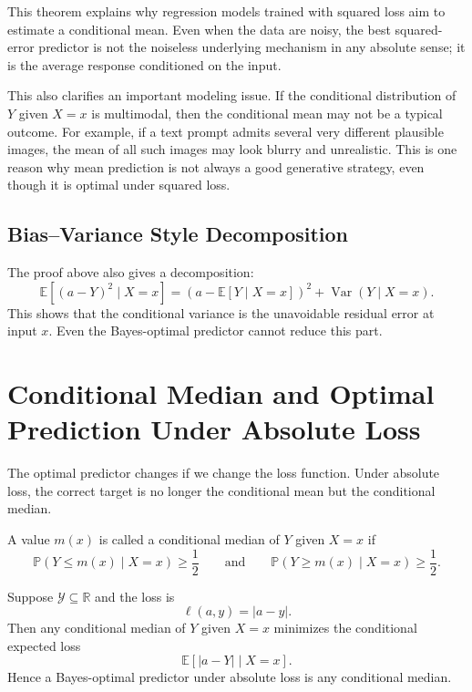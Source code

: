 This theorem explains why regression models trained with squared loss aim to estimate a conditional mean. Even when the data are noisy, the best squared-error predictor is not the noiseless underlying mechanism in any absolute sense; it is the average response conditioned on the input.

This also clarifies an important modeling issue. If the conditional distribution of $Y$ given $X=x$ is multimodal, then the conditional mean may not be a typical outcome. For example, if a text prompt admits several very different plausible images, the mean of all such images may look blurry and unrealistic. This is one reason why mean prediction is not always a good generative strategy, even though it is optimal under squared loss.

\subsection{Bias--Variance Style Decomposition}

The proof above also gives a decomposition:
\[
\mathbb{E}[(a-Y)^2\mid X=x]
= (a-\mathbb{E}[Y\mid X=x])^2 + \operatorname{Var}(Y\mid X=x).
\]
This shows that the conditional variance is the unavoidable residual error at input $x$. Even the Bayes-optimal predictor cannot reduce this part.

\section{Conditional Median and Optimal Prediction Under Absolute Loss}

The optimal predictor changes if we change the loss function. Under absolute loss, the correct target is no longer the conditional mean but the conditional median.

\begin{definition}
A value $m(x)$ is called a conditional median of $Y$ given $X=x$ if
\[
\mathbb{P}(Y\le m(x)\mid X=x)\ge \frac12
\qquad\text{and}\qquad
\mathbb{P}(Y\ge m(x)\mid X=x)\ge \frac12.
\]
\end{definition}

\begin{theorem}
Suppose $\mathcal{Y}\subseteq\mathbb{R}$ and the loss is
\[
\ell(a,y)=|a-y|.
\]
Then any conditional median of $Y$ given $X=x$ minimizes the conditional expected loss
\[
\mathbb{E}[|a-Y|\mid X=x].
\]
Hence a Bayes-optimal predictor under absolute loss is any conditional median.
\end{theorem}


